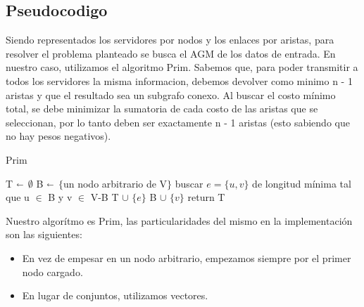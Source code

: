 \subsection{Pseudocodigo}

Siendo representados los servidores por nodos y los enlaces por aristas, para resolver el problema planteado se busca el AGM de los datos de entrada. En nuestro caso, utilizamos el algoritmo Prim.
Sabemos que, para poder transmitir a todos los servidores la misma informacion, debemos devolver como minimo n - 1 aristas y que el resultado sea un subgrafo conexo. Al buscar el costo mínimo total, se debe minimizar la sumatoria de cada costo de las aristas que se seleccionan, por lo tanto deben ser exactamente n - 1 aristas (esto sabiendo que no hay pesos negativos). 


\begin{algorithm}[H]
\caption{Prim}\label{ej2}
\begin{algorithmic}[1]
	\State T  $\shortleftarrow$ $\emptyset$
	\State B $\shortleftarrow$ $\{$un nodo arbitrario de V$\}$
		\State buscar $e=\{u,v\}$ de longitud mínima tal que u $\in$ B y v $\in$ V-B
		\State T $\cup$ $\{e\}$
		\State B $\cup$ $\{v\}$
	\EndWhile
	\State return T
\EndProcedure
\end{algorithmic}
\end{algorithm}


Nuestro algorítmo es Prim, las particularidades del mismo en la implementación son las siguientes:

\begin{itemize}
\item En vez de empesar en un nodo arbitrario, empezamos siempre por el primer nodo cargado.
\item En lugar de conjuntos, utilizamos vectores.
\end{itemize}

